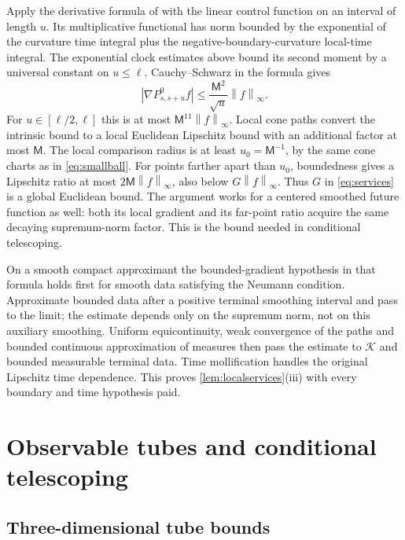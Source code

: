 \documentclass[11pt]{article}
\numberwithin{equation}{section}
\theoremstyle{definition}
\theoremstyle{remark}\newtheorem{remark}[theorem]{Remark}
\newcommand{\K}{\mathcal K}
\newcommand{\norm}[1]{\left\|#1\right\|}
\begin{document}
Apply the derivative formula of \cite[Theorem~2.5]{CZ2017} with the
linear control function on an interval of length $u$. Its multiplicative
functional has norm bounded by the exponential of the curvature time
integral plus the negative-boundary-curvature local-time integral.
The exponential clock estimates above bound its second moment by a
universal constant on $u\le\ell$. Cauchy--Schwarz in the formula gives
\[
 |\nabla P^0_{s,s+u}f|\le
       \frac{\mathsf M^2}{\sqrt u}\norm f_\infty.
\]
For $u\in[\ell/2,\ell]$ this is at most
$\mathsf M^{11}\norm f_\infty$. Local cone paths convert the intrinsic
bound to a local Euclidean Lipschitz bound with an additional factor at
most $\mathsf M$. The local comparison radius is at least
$u_0=\mathsf M^{-1}$, by the same cone charts as in
\eqref{eq:smallball}. For points farther apart than $u_0$, boundedness
gives a Lipschitz ratio at most $2\mathsf M\norm f_\infty$, also below
$G\norm f_\infty$. Thus $G$ in \eqref{eq:services} is a global Euclidean
bound. The argument works for a centered smoothed future function as well:
both its local gradient and its far-point ratio acquire the same decaying
supremum-norm factor. This is the bound needed in conditional telescoping.

On a smooth compact approximant the bounded-gradient hypothesis in that
formula holds first for smooth data satisfying the Neumann condition.
Approximate bounded data after a positive terminal smoothing interval and
pass to the limit; the estimate depends only on the supremum norm, not
on this auxiliary smoothing. Uniform equicontinuity, weak convergence of
the paths and bounded continuous approximation of measures then pass the
estimate to $\K$ and bounded measurable terminal data. Time mollification
handles the original Lipschitz time dependence. This proves
\cref{lem:localservices}(iii) with every boundary and time hypothesis paid.



\section{Observable tubes and conditional telescoping}
\label{app:mixingdetails}

\subsection{Three-dimensional tube bounds}
\label{app:tubes}
\end{document}
